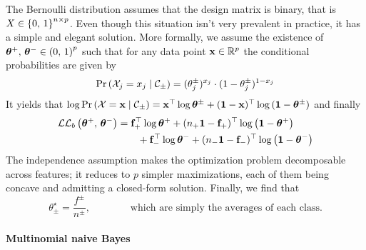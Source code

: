 The Bernoulli distribution assumes that the design matrix is binary,
that is $X \in \left\{ 0,\, 1 \right\}^{n \times p}$.
Even though this situation isn't very prevalent in practice, it has a simple and elegant solution.
More formally, we assume the existence of
$\bm{\theta}^+,\, \bm{\theta}^- \in \left( 0,\, 1 \right)^p$
such that for any data point $\mathbf{x} \in \mathbb{R}^p$ the conditional probabilities are given by
\begin{equation*}
    \Pr\left( \mathcal{X}_j = x_j \mid \mathcal{C}_\pm \right) = (\theta^\pm_j)^{x_j} \cdot (1 - \theta^\pm_j)^{1 - x_j}
\end{equation*}
It yields that $\log \Pr\left( \mathcal{X} = \mathbf{x} \mid \mathcal{C}_\pm \right) =
\mathbf{x}^\top\log\bm{\theta}^\pm + (\mathbf{1} - \mathbf{x})^\top\log\left( \mathbf{1} - \bm{\theta}^\pm \right)$
and finally
\begin{align}\label{eq:bernoulli_snb_ll}
    \mathcal{L}\mathcal{L}_b\left( \bm{\theta}^+,\, \bm{\theta}^- \right) &=
        \mathbf{f}_+^\top\log\bm{\theta}^+ + (n_+\mathbf{1} - \mathbf{f}_+)^\top\log\left( \mathbf{1} - \bm{\theta}^+ \right)\nonumber\\
        &\qquad+ \mathbf{f}_-^\top\log\bm{\theta}^- + (n_-\mathbf{1} - \mathbf{f}_-)^\top\log\left( \mathbf{1} - \bm{\theta}^- \right)
\end{align}
The independence assumption makes the optimization problem decomposable across features;
it reduces to $p$ simpler maximizations, each of them being concave and admitting a closed-form solution.
Finally, we find that
\begin{equation*}
    \theta_\pm^\star = \frac{f^\pm}{n^\pm}
    ,\qquad\qquad
    \text{which are simply the averages of each class.}
\end{equation*}

\paragraph{Multinomial naive Bayes}\label{subsubsec:mnb}

